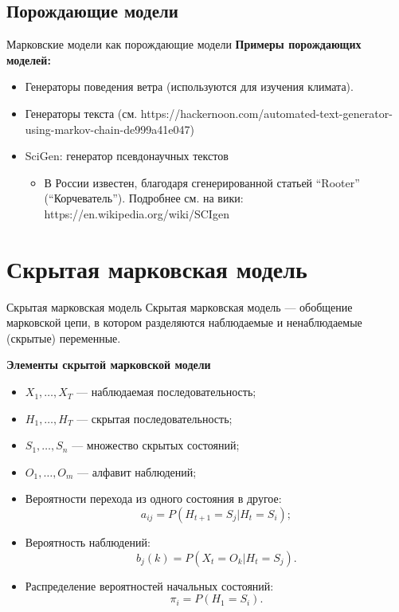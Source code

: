 \subsection{Порождающие модели}
\begin{frame}{Марковские модели как порождающие модели}
\textbf{Примеры порождающих моделей:}
\begin{itemize}
\item Генераторы поведения ветра (используются для изучения климата).
\item Генераторы текста (см. https://hackernoon.com/automated-text-generator-using-markov-chain-de999a41e047)\\        
\item SciGen: генератор псевдонаучных текстов
\begin{itemize}
\item В России известен, благодаря сгенерированной статьей ``Rooter'' (``Корчеватель''). Подробнее см. на вики: https://en.wikipedia.org/wiki/SCIgen
\end{itemize}
\end{itemize}

\end{frame}


\section{Скрытая марковская модель}
\begin{frame}{Скрытая марковская модель}
Скрытая марковская модель --- обобщение марковской цепи, в котором разделяются наблюдаемые и ненаблюдаемые (скрытые) переменные.

\textbf{Элементы скрытой марковской модели}\\
\begin{itemize}
\item $X_1, \dots, X_T $ --- наблюдаемая последовательность;
\item $H_1, \dots, H_T$ --- скрытая последовательность;
\item $S_1, \dots, S_n$ --- множество скрытых состояний;
\item $O_1, \dots, O_m$ --- алфавит наблюдений;
\item Вероятности перехода из одного состояния в другое:
\[
    a_{ij} = P(H_{t+1} = S_j|H_t = S_i);
\]
\item Вероятность наблюдений:
\[
    b_j(k) = P(X_t = O_k|H_t = S_j).
\]
\item Распределение вероятностей начальных состояний:
\[
    \pi_i = P(H_1 = S_i).
\]
\end{itemize}
\end{frame}

